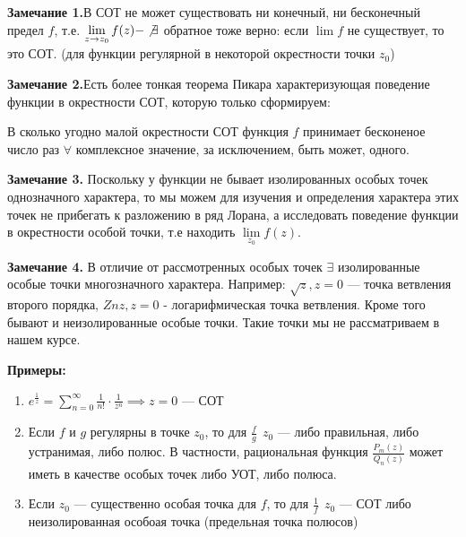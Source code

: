 \documentclass[a4paper, 12pt]{report}
\begin{document}
	\par\bigskip
	\textbf{Замечание 1.}\quad В СОТ не может существовать ни конечный, ни бесконечный предел $f$, т.е. $\lim\limits_{z \to z_0}f(z) - \not\exists$ обратное тоже верно: если $\lim f$ не существует, то это СОТ. (для функции регулярной в некоторой окрестности точки $z_0$)
	\par\bigskip
	\textbf{Замечание 2.}\quad Есть более тонкая теорема Пикара характеризующая поведение функции в окрестности СОТ, которую только сформируем:
	\par В сколько угодно малой окрестности СОТ функция $f$ принимает бесконеное число раз $\forall$ комплексное значение, за исключением, быть может, одного. 
	\par\bigskip
	\textbf{Замечание 3.} \quad Поскольку у функции не бывает изолированных особых точек однозначного характера, то мы можем для изучения и определения характера этих точек не прибегать к разложению в ряд Лорана, а исследовать поведение функции в окрестности особой точки, т.е находить $\lim\limits_{z_0}f(z)$.
	\par\bigskip
	\textbf{Замечание 4.} \quad В отличие от рассмотренных особых точек $\exists$ изолированные особые точки многозначного характера. Например: $\sqrt{z}, z = 0$ --- точка ветвления второго порядка, $Znz, z = 0$ - логарифмическая точка ветвления. Кроме того бывают и неизолированные особые точки. Такие точки мы не рассматриваем в нашем курсе. 
	\par\bigskip
	\textbf{Примеры:}
	\begin{enumerate}
	    \item  $e^{\frac{1}{z}}=\sum\limits_{n = 0}^{\infty} \frac{1}{n!}\cdot \frac{1}{z^n} \implies z = 0$ --- СОТ
	    \item Если $f$ и $g$ регулярны в точке $z_0$, то для $\frac{f}{g} \ \  z_0$ --- либо правильная, либо устранимая, либо полюс. В частности, рациональная функция $\frac{P_m(z)}{Q_n(z)}$ может иметь в качестве особых точек либо УОТ, либо полюса. 
	    \item Если $z_0$ --- существенно особая точка для $f$, то для $\frac{1}{f} \ \ z_0$ --- СОТ либо неизолированная особоая точка (предельная точка полюсов) 
	\end{enumerate}

	\par\bigskip
\end{document}
